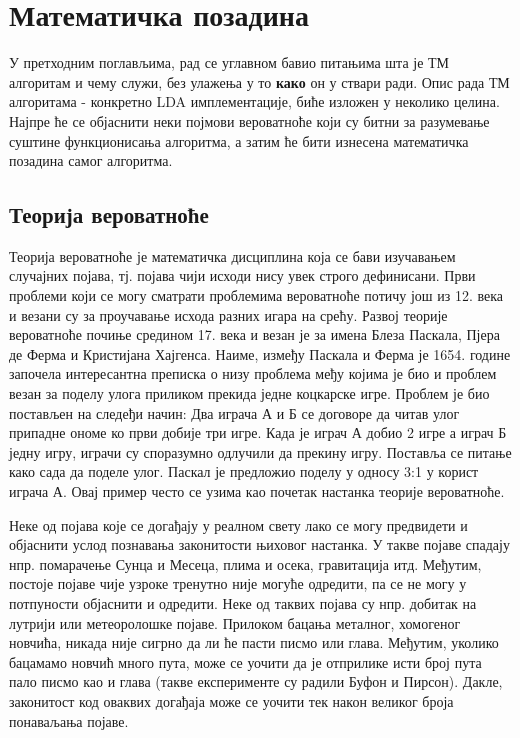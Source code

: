 \chapter{Математичка позадина}

У претходним поглављима, рад се углавном бавио питањима шта је ТМ алгоритам и чему служи, без улажења у то \textbf{како} он у ствари ради. Опис рада ТМ алгоритама - конкретно LDA имплементације, биће изложен у неколико целина. Најпре ће се објаснити неки појмови вероватноће који су битни за разумевање суштине функционисања алгоритма, а затим ће бити изнесена математичка позадина самог алгоритма.

\section{Теорија вероватноће}

Теорија вероватноће је математичка дисциплина која се бави изучавањем случајних појава, тј. појава чији исходи нису увек строго дефинисани. Први проблеми који се могу сматрати проблемима вероватноће потичу још из 12. века и везани су за проучавање исхода разних игара на срећу. Развој теорије вероватноће почиње средином 17. века и везан је за имена Блеза Паскала, Пјера де Ферма и Кристијана Хајгенса. Наиме, између Паскала и Ферма је 1654. године започела интересантна преписка о низу проблема међу којима је био и проблем везан за поделу улога приликом прекида једне коцкарске игре. Проблем је био постављен на следеђи начин: Два играча А и Б се договоре да читав улог припадне ономе ко први добије три игре. Када је играч А добио 2 игре а играч Б једну игру, играчи су споразумно одлучили да прекину игру. Поставља се питање како сада да поделе улог. Паскал је предложио поделу у односу 3:1 у корист играча А. Овај пример често се узима као почетак настанка теорије вероватноће.

Неке од појава које се догађају у реалном свету лако се могу предвидети и објаснити услод познавања законитости њиховог настанка. У такве појаве спадају нпр. помарачење Сунца и Месеца, плима и осека, гравитација итд.
Међутим, постоје појаве чије узроке тренутно није могуће одредити, па се не могу у потпуности објаснити и одредити. Неке од таквих појава су нпр. добитак на лутрији или метеоролошке појаве.
Прилоком бацања металног, хомогеног новчића, никада није сигрно да ли ће пасти писмо или глава. Међутим, уколико бацамамо новчић много пута, може се уочити да је отприлике исти број пута пало писмо као и глава (такве експерименте су радили Буфон и Пирсон). %
Дакле, законитост код оваквих догађаја може се уочити тек након великог броја понаваљања појаве.

